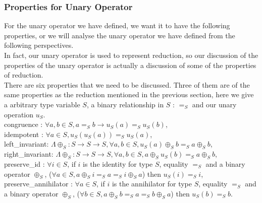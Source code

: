 \documentclass[a4paper,12pt,twoside,openright]{report}
\begin{document}
\subsubsection{Properties for Unary Operator}
For the unary operator we have defined, we want it to have the following properties, or we will analyse the unary operator we have defined from the following perspectives. \\
In fact, our unary operator is used to represent reduction, so our discussion of the properties of the unary operator is actually a discussion of some of the properties of reduction.\\
There are six properties that we need to be discussed. Three of them are of the same properties as the reduction mentioned in the previous section, here we give a arbitrary type variable $S$, a binary relationship in $S$ : $=_S$ and our unary operation $u_S$.\\
congruence : $\forall a,b \in S, a =_S b \rightarrow u_S(a) =_S u_S(b)$,\\
idempotent : $\forall a \in S, u_S(u_S(a)) =_S u_S(a)$,\\
left\_invariant: $\Lambda \oplus _S: S \rightarrow S \rightarrow S, \forall a,b \in S, u_S (a) \oplus_S b =_S a \oplus_S b$,\\
right\_invariant: $\Lambda \oplus _S: S \rightarrow S \rightarrow S, \forall a,b \in S, a \oplus_S u_S(b) =_S a \oplus_S b$,\\
preserve\_id : $\forall i \in S$, if $i$ is the identity for type $S$, equality $=_S$ and a binary operator $\oplus_S$, ($\forall a \in S, a \oplus_S i =_S a =_S i \oplus_S a$) then $u_S (i) =_S i$,\\
preserve\_annihilator : $\forall a \in S$, if $i$ is the annihilator for type $S$, equality $=_S$ and a binary operator $\oplus_S$, ($\forall b \in S, a \oplus_S b=_S a =_S b \oplus_S a$) then $u_S (b) =_S b$.
\end{document}
